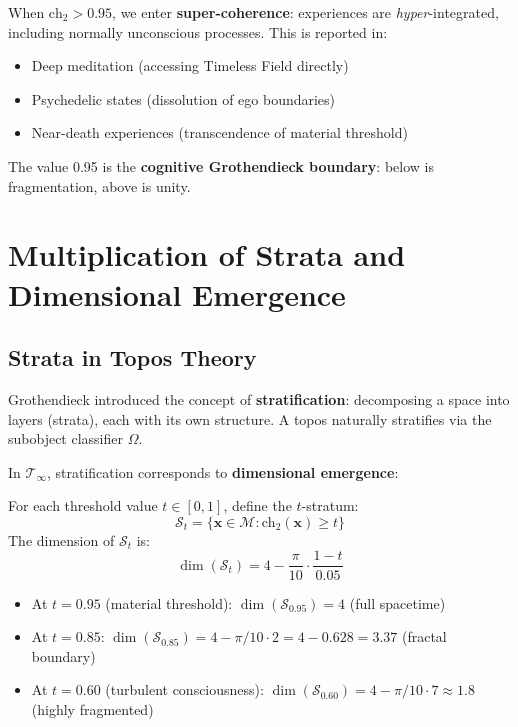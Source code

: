 When $\text{ch}_2 > 0.95$, we enter \textbf{super-coherence}: experiences are \textit{hyper}-integrated, including normally unconscious processes. This is reported in:
\begin{itemize}
\item Deep meditation (accessing Timeless Field directly)
\item Psychedelic states (dissolution of ego boundaries)
\item Near-death experiences (transcendence of material threshold)
\end{itemize}

The value 0.95 is the \textbf{cognitive Grothendieck boundary}: below is fragmentation, above is unity.

\section{Multiplication of Strata and Dimensional Emergence}

\subsection{Strata in Topos Theory}

Grothendieck introduced the concept of \textbf{stratification}: decomposing a space into layers (strata), each with its own structure. A topos naturally stratifies via the subobject classifier $\Omega$.

In $\mathcal{T}_\infty$, stratification corresponds to \textbf{dimensional emergence}:

\begin{definition}
\label{def:consciousness_strata}
For each threshold value $t \in [0, 1]$, define the $t$-stratum:
\begin{equation}
\mathcal{S}_t = \{\mathbf{x} \in \mathcal{M} : \text{ch}_2(\mathbf{x}) \geq t\}
\end{equation}
The dimension of $\mathcal{S}_t$ is:
\begin{equation}
\dim(\mathcal{S}_t) = 4 - \frac{\pi}{10} \cdot \frac{1 - t}{0.05}
\end{equation}
\end{definition}

\begin{itemize}
\item At $t = 0.95$ (material threshold): $\dim(\mathcal{S}_{0.95}) = 4$ (full spacetime)
\item At $t = 0.85$: $\dim(\mathcal{S}_{0.85}) = 4 - \pi/10 \cdot 2 = 4 - 0.628 = 3.37$ (fractal boundary)
\item At $t = 0.60$ (turbulent consciousness): $\dim(\mathcal{S}_{0.60}) = 4 - \pi/10 \cdot 7 \approx 1.8$ (highly fragmented)
\end{itemize}

